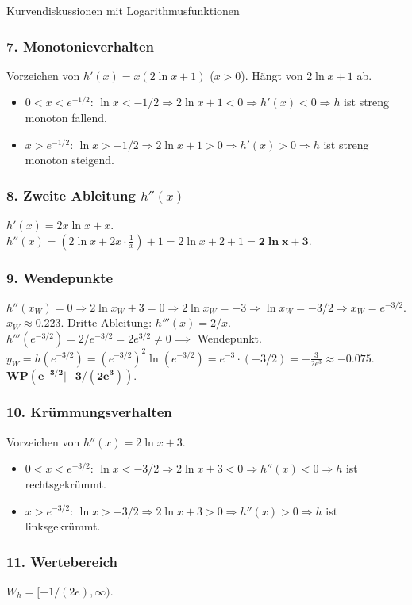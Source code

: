 \begin{loesungsumgebung}{Kurvendiskussionen mit Logarithmusfunktionen}
\begin{enumerate}[label=(\alph*)]
    \subsubsection*{7. Monotonieverhalten}
    Vorzeichen von $h'(x)=x(2\ln x+1)$ ($x>0$). Hängt von $2\ln x+1$ ab.
    \begin{itemize}
        \item $0 < x < e^{-1/2}$: $\ln x < -1/2 \Rightarrow 2\ln x+1 < 0 \Rightarrow h'(x) < 0 \Rightarrow h$ ist streng monoton fallend.
        \item $x > e^{-1/2}$: $\ln x > -1/2 \Rightarrow 2\ln x+1 > 0 \Rightarrow h'(x) > 0 \Rightarrow h$ ist streng monoton steigend.
    \end{itemize}

    \subsubsection*{8. Zweite Ableitung $h''(x)$}
    $h'(x) = 2x\ln x + x$.
    $h''(x) = (2\ln x + 2x \cdot \frac{1}{x}) + 1 = 2\ln x + 2 + 1 = \mathbf{2\ln x + 3}$.

    \subsubsection*{9. Wendepunkte}
    $h''(x_W)=0 \Rightarrow 2\ln x_W + 3 = 0 \Rightarrow 2\ln x_W = -3 \Rightarrow \ln x_W = -3/2 \Rightarrow x_W = e^{-3/2}$.
    $x_W \approx 0.223$.
    Dritte Ableitung: $h'''(x) = 2/x$. $h'''(e^{-3/2}) = 2/e^{-3/2} = 2e^{3/2} \neq 0 \implies$ Wendepunkt.
    $y_W = h(e^{-3/2}) = (e^{-3/2})^2 \ln(e^{-3/2}) = e^{-3} \cdot (-3/2) = -\frac{3}{2e^3} \approx -0.075$.
    $\mathbf{WP(e^{-3/2}|-3/(2e^3))}$.

    \subsubsection*{10. Krümmungsverhalten}
    Vorzeichen von $h''(x)=2\ln x+3$.
    \begin{itemize}
        \item $0 < x < e^{-3/2}$: $\ln x < -3/2 \Rightarrow 2\ln x+3 < 0 \Rightarrow h''(x) < 0 \Rightarrow h$ ist rechtsgekrümmt.
        \item $x > e^{-3/2}$: $\ln x > -3/2 \Rightarrow 2\ln x+3 > 0 \Rightarrow h''(x) > 0 \Rightarrow h$ ist linksgekrümmt.
    \end{itemize}

    \subsubsection*{11. Wertebereich}
    $W_h = [-1/(2e), \infty)$.
\end{enumerate}


\end{loesungsumgebung}
